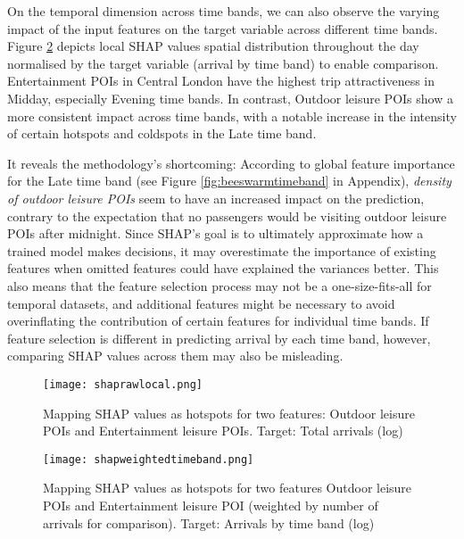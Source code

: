 On the temporal dimension across time bands, we can also observe the varying impact of the input features on the target variable across different time bands. Figure \ref{fig:shapweightedtimeband} depicts local SHAP values spatial distribution throughout the day normalised by the target variable (arrival by time band) to enable comparison. Entertainment POIs in Central London have the highest trip attractiveness in Midday, especially Evening time bands. In contrast, Outdoor leisure POIs show a more consistent impact across time bands, with a notable increase in the intensity of certain hotspots and coldspots in the Late time band. 

It reveals the methodology's shortcoming: According to global feature importance for the Late time band (see Figure \ref{fig:beeswarmtimeband} in Appendix), \textit{density of outdoor leisure POIs} seem to have an increased impact on the prediction, contrary to the expectation that no passengers would be visiting outdoor leisure POIs after midnight. Since SHAP's goal is to ultimately approximate how a trained model makes decisions, it may overestimate the importance of existing features when omitted features could have explained the variances better. This also means that the feature selection process may not be a one-size-fits-all for temporal datasets, and additional features might be necessary to avoid overinflating the contribution of certain features for individual time bands. If feature selection is different in predicting arrival by each time band, however, comparing SHAP values across them may also be misleading.

\begin{figure}[ht]
    \centering
    \texttt{[image: shaprawlocal.png]}
    \captionsetup{justification=centering}
    \caption{Mapping SHAP values as hotspots for two features: Outdoor leisure POIs and Entertainment leisure POIs. Target: Total arrivals (log)}
    \label{fig:shapraw}
\end{figure}

\begin{figure}[ht]
    \centering
    \texttt{[image: shapweightedtimeband.png]}
    \captionsetup{justification=centering}
    \caption{Mapping SHAP values as hotspots for two features Outdoor leisure POIs and Entertainment leisure POI (weighted by number of arrivals for comparison). Target: Arrivals by time band (log)}
    \label{fig:shapweightedtimeband}
\end{figure}

